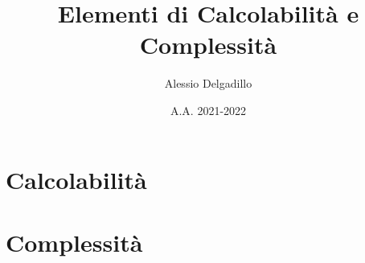 \documentclass[12pt, a4paper]{report}
\title{Elementi di Calcolabilità e Complessità}
\date{A.A. 2021-2022}
\author{Alessio Delgadillo}
\theoremstyle{definition}
\theoremstyle{remark}
\begin{document}
\maketitle
\newpage
\tableofcontents

\chapter{Calcolabilità}











\chapter{Complessità}





\end{document}
